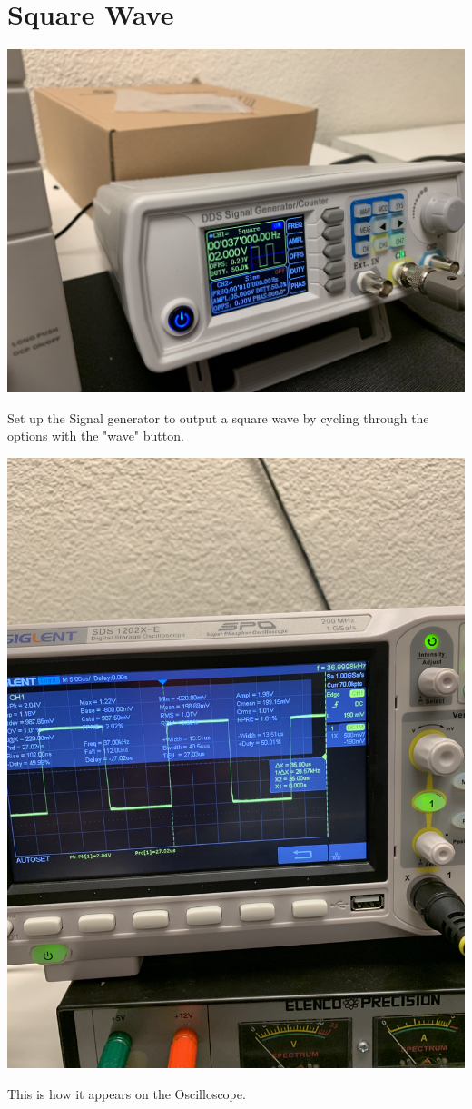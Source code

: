 \documentclass[]{article}
\begin{document}
\section{Square Wave}
	\begin{center}
		\includegraphics[scale=.05]{square_func.jpg}\\
	\end{center}
	Set up the Signal generator to output a square wave by cycling through the options with the "wave" button.\\

	\begin{center}
		\includegraphics[scale=.05]{square_osci.jpg}\\
	\end{center}
	This is how it appears on the Oscilloscope.
\end{document}
